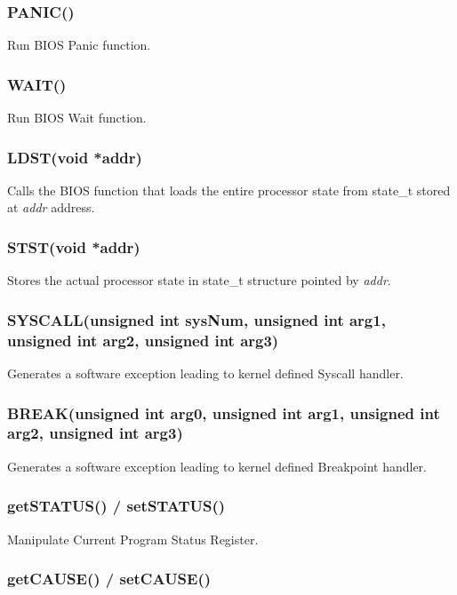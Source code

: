 \subsubsection{PANIC()}

Run BIOS Panic function.

\subsubsection{WAIT()}

Run BIOS Wait function.

\subsubsection{LDST(void *addr)}

Calls the BIOS function that loads the entire processor state from state\_t stored at \emph{addr} address.

\subsubsection{STST(void *addr)}

Stores the actual processor state in state\_t structure pointed by \emph{addr}.

\subsubsection{SYSCALL(unsigned int sysNum, unsigned int arg1, unsigned int arg2, unsigned int arg3)}

Generates a software exception leading to kernel defined Syscall handler.

\subsubsection{BREAK(unsigned int arg0, unsigned int arg1, unsigned int arg2, unsigned int arg3)}

Generates a software exception leading to kernel defined Breakpoint handler.

\subsubsection{getSTATUS() / setSTATUS()}

Manipulate Current Program Status Register.

\subsubsection{getCAUSE() / setCAUSE()}

